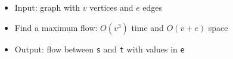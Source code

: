 \begin{itemize}
	\item Input: graph with $v$ vertices and $e$ edges
	\item Find a maximum flow: $O(v^3)$ time and $O(v+e)$ space
	\item Output: flow between \lstinline{s} and \lstinline{t} with values in \lstinline{e}
\end{itemize}
